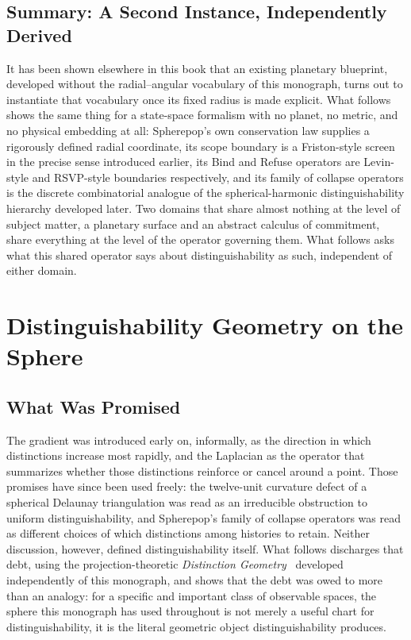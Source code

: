 \documentclass[11pt,fleqn]{book}
\numberwithin{equation}{chapter}
\theoremstyle{plain}
\theoremstyle{definition}
\theoremstyle{remark}
\begin{document}
\section{Summary: A Second Instance, Independently Derived}

It has been shown elsewhere in this book that an existing planetary blueprint, developed without the radial--angular vocabulary of this monograph, turns out to instantiate that vocabulary once its fixed radius is made explicit. What follows shows the same thing for a state-space formalism with no planet, no metric, and no physical embedding at all: Spherepop's own conservation law supplies a rigorously defined radial coordinate, its scope boundary is a Friston-style screen in the precise sense introduced earlier, its Bind and Refuse operators are Levin-style and RSVP-style boundaries respectively, and its family of collapse operators is the discrete combinatorial analogue of the spherical-harmonic distinguishability hierarchy developed later. Two domains that share almost nothing at the level of subject matter, a planetary surface and an abstract calculus of commitment, share everything at the level of the operator governing them. What follows asks what this shared operator says about distinguishability as such, independent of either domain.



\chapter{Distinguishability Geometry on the Sphere}

\section{What Was Promised}

The gradient was introduced early on, informally, as the direction in which distinctions increase most rapidly, and the Laplacian as the operator that summarizes whether those distinctions reinforce or cancel around a point. Those promises have since been used freely: the twelve-unit curvature defect of a spherical Delaunay triangulation was read as an irreducible obstruction to uniform distinguishability, and Spherepop's family of collapse operators was read as different choices of which distinctions among histories to retain. Neither discussion, however, defined distinguishability itself. What follows discharges that debt, using the projection-theoretic \emph{Distinction Geometry}~\cite{distinction-geometry} developed independently of this monograph, and shows that the debt was owed to more than an analogy: for a specific and important class of observable spaces, the sphere this monograph has used throughout is not merely a useful chart for distinguishability, it is the literal geometric object distinguishability produces.
\end{document}
